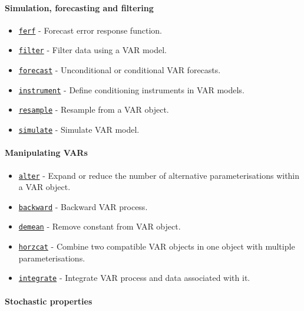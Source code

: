 \paragraph{Simulation, forecasting and
filtering}\label{simulation-forecasting-and-filtering}

\begin{itemize}
\itemsep1pt\parskip0pt
\item
  \href{VAR/ferf}{\texttt{ferf}} - Forecast error response function.
\item
  \href{VAR/filter}{\texttt{filter}} - Filter data using a VAR model.
\item
  \href{VAR/forecast}{\texttt{forecast}} - Unconditional or conditional
  VAR forecasts.
\item
  \href{VAR/instrument}{\texttt{instrument}} - Define conditioning
  instruments in VAR models.
\item
  \href{VAR/resample}{\texttt{resample}} - Resample from a VAR object.
\item
  \href{VAR/simulate}{\texttt{simulate}} - Simulate VAR model.
\end{itemize}

\paragraph{Manipulating VARs}\label{manipulating-vars}

\begin{itemize}
\itemsep1pt\parskip0pt
\item
  \href{VAR/alter}{\texttt{alter}} - Expand or reduce the number of
  alternative parameterisations within a VAR object.
\item
  \href{VAR/backward}{\texttt{backward}} - Backward VAR process.
\item
  \href{VAR/demean}{\texttt{demean}} - Remove constant from VAR object.
\item
  \href{VAR/horzcat}{\texttt{horzcat}} - Combine two compatible VAR
  objects in one object with multiple parameterisations.
\item
  \href{VAR/integrate}{\texttt{integrate}} - Integrate VAR process and
  data associated with it.
\end{itemize}

\paragraph{Stochastic properties}\label{stochastic-properties}

